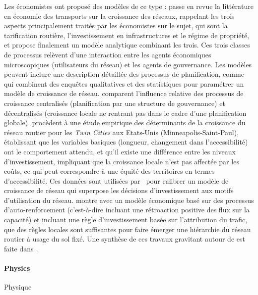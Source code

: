 {Les économistes ont proposé des modèles de ce type : \cite{zhang2007economics} passe en revue la littérature en économie des transports sur la croissance des réseaux, rappelant les trois aspects principalement traités par les économistes sur le sujet, qui sont la tarification routière, l'investissement en infrastructures et le régime de propriété, et propose finalement un modèle analytique combinant les trois. Ces trois classes de processus relèvent d'une interaction entre les agents économiques microscopiques (utilisateurs du réseau) et les agents de gouvernance. Les modèles peuvent inclure une description détaillée des processus de planification, comme~\cite{levinson2012forecasting} qui combinent des enquêtes qualitatives et des statistiques pour paramétrer un modèle de croissance de réseau. \cite{xie2009jurisdictional} comparent l'influence relative des processus de croissance centralisés (planification par une structure de gouvernance) et décentralisés (croissance locale ne rentrant pas dans le cadre d'une planification globale). \cite{levinson2003induced} procèdent à une étude empirique des déterminants de la croissance du réseau routier pour les \emph{Twin Cities} aux Etats-Unis (Minneapolis-Saint-Paul), établissant que les variables basiques (longueur, changement dans l'accessibilité) ont le comportement attendu, et qu'il existe une différence entre les niveaux d'investissement, impliquant que la croissance locale n'est pas affectée par les coûts, ce qui peut correspondre à une équité des territoires en termes d'accessibilité. Ces données sont utilisées par~\cite{zhang2016model} pour calibrer un modèle de croissance de réseau qui superpose les décisions d'investissement aux motifs d'utilisation du réseau. \cite{yerra2005emergence} montre avec un modèle économique basé sur des processus d'auto-renforcement (c'est-à-dire incluant une rétroaction positive des flux sur la capacité) et incluant une règle d'investissement basée sur l'attribution du trafic, que des règles locales sont suffisantes pour faire émerger une hiérarchie du réseau routier à usage du sol fixé. Une synthèse de ces travaux gravitant autour de  est faite dans~\cite{xie2011evolving}.
}



\paragraph{Physics}{Physique}

